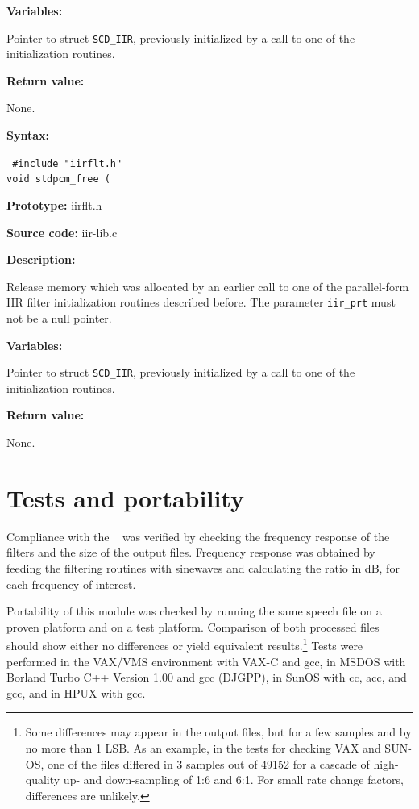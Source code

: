 {\bf Variables: }
\begin{Descr}{\DescrLen}
\item[\pbox{20mm}{\em iir\_ptr}] %
        Pointer to struct {\tt SCD\_IIR}, previously initialized by a call to
        one of the initialization routines.
\end{Descr}

{\bf Return value: }

None.



{\bf Syntax: }

{\tt
\#include "iirflt.h"\\
void stdpcm\_free (
}

{\bf Prototype: }    iirflt.h

{\bf Source code: }  iir-lib.c

{\bf Description: }

Release memory which was allocated by an earlier call to one of
the parallel-form IIR filter initialization routines described before.
The parameter {\tt iir\_prt} must not be a null pointer.

{\bf Variables: }
\begin{Descr}{\DescrLen}
\item[\pbox{20mm}{\em iir\_ptr}] %
        Pointer to struct {\tt SCD\_IIR}, previously initialized by a call to
        one of the initialization routines.
\end{Descr}


{\bf Return value: }

None.


\section {Tests and portability} \label{RATE-Tests}

Compliance with the \ROs~ was verified by checking the frequency
response of the filters and the size of the output files. Frequency
response was obtained by feeding the filtering routines with sinewaves
and calculating the ratio in dB, for each frequency of interest.

Portability of this module was checked by running the same speech file
on a proven platform and on a test platform. Comparison of both
processed files should show either no differences or yield equivalent
results.\footnote{\SF Some differences may appear in the output files,
but for a few samples and by no more than 1 LSB. As an example, in the
tests for checking VAX and SUN-OS, one of the files differed in 3
samples out of 49152 for a cascade of high-quality up- and
down-sampling of 1:6 and 6:1. For small rate change factors,
differences are unlikely.} Tests were performed in the VAX/VMS
environment with VAX-C and gcc, in MSDOS with Borland Turbo C++
Version 1.00 and gcc (DJGPP), in SunOS with cc, acc, and gcc, and in
HPUX with gcc.


